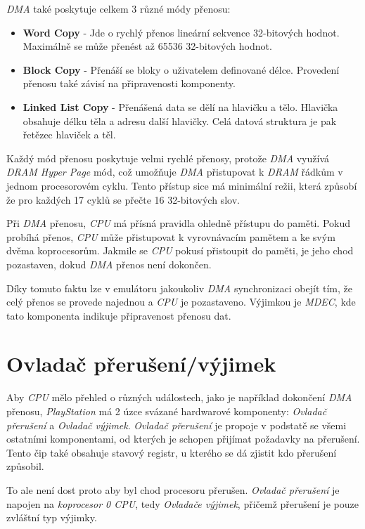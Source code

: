 \textit{DMA} také poskytuje celkem 3 různé módy přenosu:

\begin{itemize}
    \item{\textbf{Word Copy} - Jde o rychlý přenos lineární sekvence 32-bitových hodnot. Maximálně se může přenést až 65536 32-bitových hodnot.}
    \item{\textbf{Block Copy} - Přenáší se bloky o uživatelem definované délce. Provedení přenosu také závisí na připravenosti komponenty.}
    \item{\textbf{Linked List Copy} - Přenášená data se dělí na hlavičku a tělo. Hlavička obsahuje délku těla a adresu další hlavičky. Celá datová struktura je pak řetězec hlaviček a těl.}
\end{itemize}

Každý mód přenosu poskytuje velmi rychlé přenosy, protože \textit{DMA} využívá \textit{DRAM Hyper Page} mód,
což umožňuje \textit{DMA} přistupovat k \textit{DRAM} řádkům v jednom procesorovém cyklu. Tento přístup sice
má minimální režii, která způsobí že pro každých 17 cyklů se přečte 16 32-bitových slov.

Při \textit{DMA} přenosu, \textit{CPU} má přísná pravidla ohledně přístupu do paměti. Pokud probíhá přenos,
\textit{CPU} může přistupovat k vyrovnávacím pamětem a ke svým dvěma koprocesorům. Jakmile se \textit{CPU}
pokusí přistoupit do paměti, je jeho chod pozastaven, dokud \textit{DMA} přenos není dokončen.

Díky tomuto faktu lze v emulátoru jakoukoliv \textit{DMA} synchronizaci obejít tím, že celý přenos se provede najednou
a \textit{CPU} je pozastaveno. Výjimkou je \textit{MDEC}, kde tato komponenta indikuje připravenost přenosu dat.

\section{Ovladač přerušení/výjimek}

Aby \textit{CPU} mělo přehled o různých událostech, jako je například dokončení \textit{DMA} přenosu, \textit{PlayStation}
má 2 úzce svázané hardwarové komponenty: \textit{Ovladač přerušení} a \textit{Ovladač výjimek}. \textit{Ovladač přerušení}
je propoje v podstatě se všemi ostatními komponentami, od kterých je schopen přijímat požadavky na přerušení. Tento
čip také obsahuje stavový registr, u kterého se dá zjistit kdo přerušení způsobil.

To ale není dost proto aby byl chod procesoru přerušen. \textit{Ovladač přerušení} je napojen na \textit{koprocesor 0 CPU},
tedy \textit{Ovladače výjimek}, přičemž přerušení je pouze zvláštní typ výjimky.

